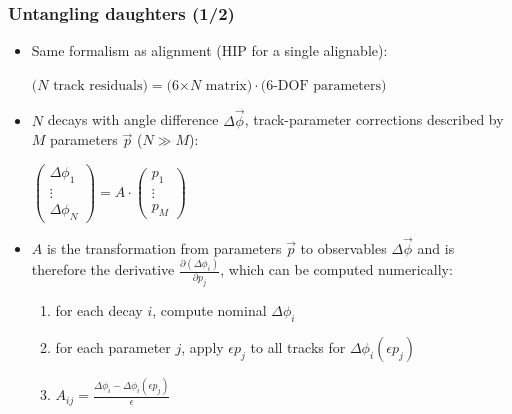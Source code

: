 \documentclass[compress]{beamer}
\begin{document}
\begin{frame}
\frametitle{Untangling daughters (1/2)}

\begin{itemize}
\item Same formalism as alignment (HIP for a single alignable):
\begin{center}
$\mbox{($N$ track residuals)} = \mbox{(6$\times N$ matrix)} \cdot \mbox{(6-DOF parameters)}$
\end{center}

\item $N$ decays with angle difference $\Delta \vec{\phi}$, track-parameter
  corrections described by $M$ parameters $\vec{p}$ ($N \gg M$):
\begin{center}
$\left(\begin{array}{c}\Delta \phi_1 \\ \vdots \\ \Delta \phi_N \end{array}\right) = A \cdot \left(\begin{array}{c}p_1 \\ \vdots \\ p_M \end{array}\right)$
\end{center}

\item $A$ is the transformation from parameters $\vec{p}$ to
  observables $\Delta \vec{\phi}$ and is therefore the derivative
  $\frac{\partial \left(\Delta \phi_i \right)}{\partial p_j}$, which can be computed \mbox{numerically:\hspace{-1 cm}}
\begin{enumerate}\setlength{\itemsep}{0.2 cm}
\item for each decay $i$, compute nominal $\Delta \phi_i$
\item for each parameter $j$, apply $\epsilon p_j$ to all tracks for $\Delta \phi_i(\epsilon p_j)$
\item $\displaystyle A_{ij} = \frac{\Delta \phi_i - \Delta \phi_i(\epsilon p_j)}{\epsilon}$
\end{enumerate}
\end{itemize}
\end{frame}
\end{document}
